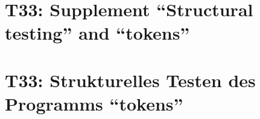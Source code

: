 

\thispagestyle{empty}
\ifenglish
\section*{T33: Supplement ``Structural testing'' and ``tokens''}

\fi
\ifgerman
\section*{T33: Strukturelles Testen des Programms "`tokens"'}

\fi

